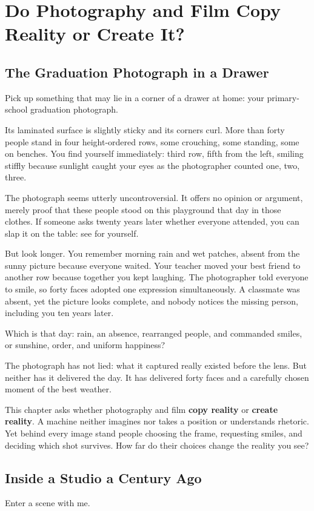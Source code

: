 \chapter[Photo and Film: Copy or Creation?]{Do Photography and Film Copy Reality or Create It?}
\section{The Graduation Photograph in a Drawer}
Pick up something that may lie in a corner of a drawer at home: your primary-school graduation photograph.

Its laminated surface is slightly sticky and its corners curl. More than forty people stand in four height-ordered rows, some crouching, some standing, some on benches. You find yourself immediately: third row, fifth from the left, smiling stiffly because sunlight caught your eyes as the photographer counted one, two, three.

The photograph seems utterly uncontroversial. It offers no opinion or argument, merely proof that these people stood on this playground that day in those clothes. If someone asks twenty years later whether everyone attended, you can slap it on the table: see for yourself.

But look longer. You remember morning rain and wet patches, absent from the sunny picture because everyone waited. Your teacher moved your best friend to another row because together you kept laughing. The photographer told everyone to smile, so forty faces adopted one expression simultaneously. A classmate was absent, yet the picture looks complete, and nobody notices the missing person, including you ten years later.

Which is that day: rain, an absence, rearranged people, and commanded smiles, or sunshine, order, and uniform happiness?

The photograph has not lied: what it captured really existed before the lens. But neither has it delivered the day. It has delivered forty faces and a carefully chosen moment of the best weather.

This chapter asks whether photography and film \textbf{copy reality} or \textbf{create reality}. A machine neither imagines nor takes a position or understands rhetoric. Yet behind every image stand people choosing the frame, requesting smiles, and deciding which shot survives. How far do their choices change the reality you see?

\section{Inside a Studio a Century Ago}
Enter a scene with me.

